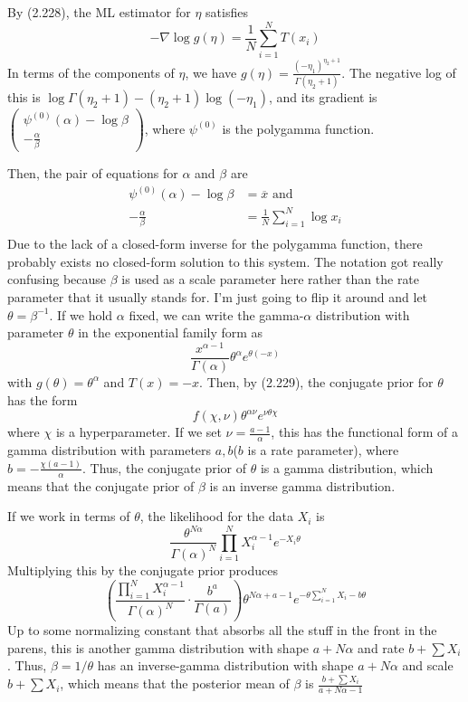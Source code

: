 \documentclass{article}
\newcommand{\conj}{\overline}
\newcommand{\openm}{\begin{pmatrix}}
\newcommand{\closem}{\end{pmatrix}}
\begin{document}
By (2.228), the ML estimator for $\eta$ satisfies
\[-\nabla \log g(\eta)=\frac{1}{N}\sum_{i=1}^NT(x_i)\]
In terms of the components of $\eta$, we have $g(\eta)=\frac{(-\eta_1)^{\eta_2+1}}{\Gamma(\eta_2+1)}$. The negative log of this is $\log\Gamma(\eta_2+1)-(\eta_2+1)\log(-\eta_1)$, and its gradient is $\openm\psi^{(0)}(\alpha)-\log\beta\\-\frac{\alpha}{\beta}\closem$, where $\psi^{(0)}$ is the polygamma function.

Then, the pair of equations for $\alpha$ and $\beta$ are 
\begin{align*}
    \psi^{(0)}(\alpha)-\log\beta&=\conj{x}\text{ and}\\
    -\frac{\alpha}{\beta}&=\frac{1}{N}\sum_{i=1}^N\log x_i\\
\end{align*}
Due to the lack of a closed-form inverse for the polygamma function, there probably exists no closed-form solution to this system.
The notation got really confusing because $\beta$ is used as a scale parameter here rather than the rate parameter that it usually stands for. I'm just going to flip it around and let $\theta=\beta^{-1}$. If we hold $\alpha$ fixed, we can write the gamma-$\alpha$ distribution with parameter $\theta$ in the exponential family form as
\[\frac{x^{\alpha-1}}{\Gamma(\alpha)}\theta^\alpha e^{\theta(-x)}\]
with $g(\theta)=\theta^\alpha$ and $T(x)=-x$. Then, by (2.229), the conjugate prior for $\theta$ has the form
\[f(\chi, \nu)\theta^{\alpha\nu}e^{\nu\theta\chi}\]
where $\chi$ is a hyperparameter. If we set $\nu=\frac{a-1}{\alpha}$, this has the functional form of a gamma distribution with parameters $a,b$($b$ is a rate parameter), where $b=-\frac{\chi(a-1)}{\alpha}$. Thus, the conjugate prior of $\theta$ is a gamma distribution, which means that the conjugate prior of $\beta$ is an inverse gamma distribution.

If we work in terms of $\theta$, the likelihood for the data $X_i$ is 
\[\frac{\theta^{N\alpha}}{\Gamma(\alpha)^N}\prod_{i=1}^NX_i^{\alpha-1}e^{-X_i\theta}\]
Multiplying this by the conjugate prior produces
\[\left(\frac{\prod_{i=1}^NX_i^{\alpha-1}}{\Gamma(\alpha)^N}\cdot\frac{b^a}{\Gamma(a)}\right)\theta^{N\alpha+a-1}e^{-\theta\sum_{i=1}^NX_i-b\theta}\]
Up to some normalizing constant that absorbs all the stuff in the front in the parens, this is another gamma distribution with shape $a+N\alpha$ and rate $b+\sum X_i$. Thus, $\beta=1/\theta$ has an inverse-gamma distribution with shape $a+N\alpha$ and scale $b+\sum X_i$, which means that the posterior mean of $\beta$ is $\frac{b+\sum X_i}{a+N\alpha-1}$
\end{document}
